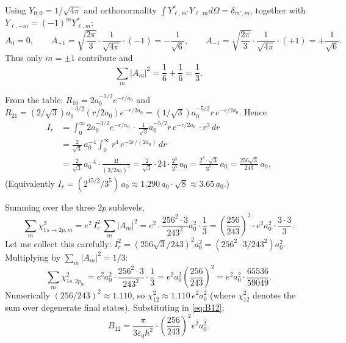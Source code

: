 \documentclass[11pt]{article}
\begin{document}
Using $Y_{0,0}=1/\sqrt{4\pi}$ and orthonormality $\int Y_{\ell,m'}^*Y_{\ell,m}d\Omega=\delta_{m',m}$, together with $Y_{\ell,-m}=(-1)^m Y_{\ell,m}^*$:
\begin{equation*}
    A_0 = 0,\qquad A_{+1} = \sqrt{\frac{2\pi}{3}}\cdot\frac{1}{\sqrt{4\pi}}\cdot(-1) = -\frac{1}{\sqrt{6}},\qquad A_{-1} = \sqrt{\frac{2\pi}{3}}\cdot\frac{1}{\sqrt{4\pi}}\cdot(+1) = +\frac{1}{\sqrt{6}}.
\end{equation*}
Thus only $m=\pm 1$ contribute and
\begin{equation*}
    \sum_m |A_m|^2 = \frac{1}{6}+\frac{1}{6}=\frac{1}{3}.
\end{equation*}

From the table: $R_{10}=2 a_0^{-3/2}e^{-r/a_0}$ and $R_{21}=(2/\sqrt{3})a_0^{-3/2}(r/2a_0)e^{-r/2a_0}=(1/\sqrt{3})a_0^{-5/2}r\,e^{-r/2a_0}$. Hence
\begin{align*}
    I_r &= \int_0^\infty\!\! 2a_0^{-3/2}e^{-r/a_0}\,\cdot\,\frac{1}{\sqrt{3}}a_0^{-5/2}r\,e^{-r/2a_0}\,\cdot r^3\,dr \\
    &= \frac{2}{\sqrt{3}}\,a_0^{-4}\int_0^\infty r^4\,e^{-3r/(2a_0)}\,dr \\
    &= \frac{2}{\sqrt{3}}\,a_0^{-4}\cdot\frac{4!}{(3/2a_0)^5} = \frac{2}{\sqrt{3}}\cdot 24\cdot\frac{2^5}{3^5}\,a_0 = \frac{2^{8}\cdot\sqrt{3}}{3^{5}}\,a_0 = \frac{256\sqrt{3}}{243}\,a_0.
\end{align*}
(Equivalently $I_r = (2^{15/2}/3^{5})\,a_0\approx 1.290\,a_0\cdot\sqrt{8}\approx 3.65\,a_0$.)

Summing over the three $2p$ sublevels,
\begin{equation*}
    \sum_m \chi_{1s\to 2p,m}^2 = e^2\,I_r^2\,\sum_m |A_m|^2 = e^2\cdot\frac{256^2\cdot 3}{243^2}a_0^2\cdot\frac{1}{3} = \left(\frac{256}{243}\right)^{2}\!\cdot e^2 a_0^2\cdot\frac{3\cdot 3}{3}.
\end{equation*}
Let me collect this carefully: $I_r^2 = (256\sqrt{3}/243)^2 a_0^2 = (256^2\cdot 3/243^2)a_0^2$. Multiplying by $\sum_m|A_m|^2=1/3$:
\begin{equation*}
    \sum_m\chi_{1s,2p_m}^2 = e^2 a_0^2\cdot\frac{256^2\cdot 3}{243^2}\cdot\frac{1}{3} = e^2 a_0^2\left(\frac{256}{243}\right)^2 = e^2 a_0^2\cdot\frac{65536}{59049}.
\end{equation*}
Numerically $(256/243)^2\approx 1.110$, so $\chi_{12}^2\approx 1.110\,e^2 a_0^2$ (where $\chi_{12}^2$ denotes the sum over degenerate final states). Substituting in \eqref{eq:B12}:
\begin{equation*}
    B_{12} = \frac{\pi}{3\varepsilon_0\hbar^2}\cdot\left(\frac{256}{243}\right)^2 e^2 a_0^2.
\end{equation*}
\end{document}
